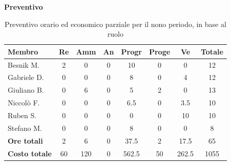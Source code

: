 \documentclass[a4paper,10pt]{article}
\begin{document}
\textbf{Preventivo} \\
\begin{table}[H]
\centering
\begin{tabular}{|l|c|c|c|c|c|c|c|}
\hline
\textbf{Membro} & \textbf{Re} & \textbf{Amm} & \textbf{An} & \textbf{Progr} & \textbf{Proge} & \textbf{Ve} & \textbf{Totale} \\
\hline
Besnik M.   & 2   & 0   & 0 & 10   & 0 & 0 & 12 \\
Gabriele D. & 0   & 0   & 0 & 8   & 0 & 4  & 12 \\
Giuliano B. & 0   & 6   & 0 & 5   & 2 & 0  & 13 \\
Niccolò F.  & 0   & 0   & 0 & 6.5   & 0 & 3.5  & 10 \\
Ruben S.    & 0   & 0   & 0 & 0   & 0 & 10  & 10 \\
Stefano M.  & 0   & 0   & 0 & 8   & 0 & 0  & 8 \\
\hline
\textbf{Ore totali} & 2  & 6 & 0 & 37.5  & 2  & 17.5 & 65 \\
\hline
\textbf{Costo totale} & 60  & 120 & 0 & 562.5  & 50  & 262.5 & 1055 \\
\hline
\end{tabular}
\caption{Preventivo orario ed economico parziale per il nono periodo, in base al ruolo}
\end{table}
\end{document}

